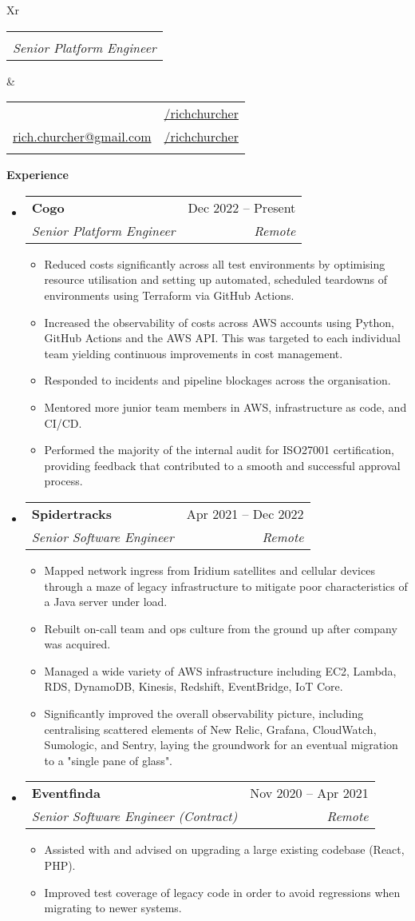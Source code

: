 \documentclass[12pt]{article}
\makeatletter
\def \fullname {Rich Churcher}
\def \subtitle {Senior Platform Engineer}
\def \linkedinicon {\faLinkedin}
\def \linkedinlink {https://linkedin.com/in/dwight-schrute/}
\def \linkedintext {/richchurcher}
\def \phoneicon {\faPhone}
\def \phonetext {+64-21-126-3919}
\def \emailicon {\faEnvelope}
\def \emaillink {mailto:rich.churcher@gmail.com}
\def \emailtext {rich.churcher@gmail.com}
\def \githubicon {\faGithub}
\def \githublink {https://github.com/richchurcher}
\def \githubtext {/richchurcher}
\def \headertype {\doublecol} %
\def \linkedin {\linkedinicon \hspace{1em}\href{\linkedinlink}{\linkedintext}}
\def \phone {\phoneicon \hspace{1em}{\phonetext}}
\def \email {\emailicon \hspace{1em}\href{\emaillink}{\emailtext}}
\def \github {\githubicon \hspace{1em}\href{\githublink}{\githubtext}}
\renewcommand{\section}[2]{\vspace{0.5ex}
  \colorbox{secondary}{\color{white}\raggedbottom\normalsize\textbf{{#1}{\hspace{0.5em}#2}}}
}
\newcommand{\resumeEntry}[1]{\begin{itemize}[leftmargin=2.5mm]#1\end{itemize}}
\newcommand{\resumeItemList}[1]{\begin{itemize}[leftmargin=4.5mm]#1\end{itemize}}
\newcommand{\resumeItem}[1]{
  \item\small{
    {#1 \vspace{-0.9ex}}
  }
}
\newcommand{\resumeEntryTSDL}[4]{
  \vspace{-0.5ex}\item[]
    \begin{tabularx}{0.97\textwidth}{X@{\hspace{5em}}r}
      \textbf{\color{primary}#1} & {\firabook\color{accent}\small#2} \\
      \textit{\color{accent}\small#3} & \textit{\color{accent}\small#4} \\
    \end{tabularx}\vspace{-0.9ex}
}
\newcommand{\doublecol}[6]{
  \begin{tabularx}{\textwidth}{Xr}
    {
      \begin{tabular}[c]{l}
        \fontsize{35}{45}\selectfont{\color{primary}{{\textbf{\fullname}}}} \\
          {\textit{\subtitle}}
      \end{tabular}\vspace{2ex}
    } & {
      \begin{tabular}[c]{l@{\hspace{1em}}l}
        {\small#4} & {\small#1} \\
        {\small#5} & {\small#2} \\
        {\small#6} & {\small#3}
      \end{tabular}
    }
  \end{tabularx}
}
\newcommand{\singlecol}[6]{
  \begin{tabularx}{\textwidth}{Xr}
    {
      \begin{tabular}[b]{l}
        \fontsize{35}{45}\selectfont{\color{primary}{{\textbf{\fullname}}}} \\
        {\textit{\subtitle}} %
      \end{tabular}
    } & {
      \begin{tabular}[c]{l}
        {\small#1} \\
        {\small#2} \\
        {\small#3} \\
        {\small#4} \\
        {\small#5} \\
        {\small#6}
      \end{tabular}
    }
  \end{tabularx}
}
\makeatother
\begin{document}
\headertype{\linkedin}{\github}{}{\phone}{\email}{}

\section{\faPieChart}{Experience}

  \resumeEntry{
    \resumeEntryTSDL
      {Cogo}{Dec 2022 -- Present}
      {Senior Platform Engineer}{Remote}
    \resumeItemList{
      \resumeItem {Reduced costs significantly across all test environments by optimising resource utilisation and setting up automated, scheduled teardowns of environments using Terraform via GitHub Actions.}
      \resumeItem {Increased the observability of costs across AWS accounts using Python, GitHub Actions and the AWS API. This was targeted to each individual team yielding continuous improvements in cost management.}
      \resumeItem {Responded to incidents and pipeline blockages across the organisation.}
      \resumeItem {Mentored more junior team members in AWS, infrastructure as code, and CI/CD.}
      \resumeItem {Performed the majority of the internal audit for ISO27001 certification, providing feedback that contributed to a smooth and successful approval process.}
    }
  }

  \resumeEntry{
    \resumeEntryTSDL
      {Spidertracks}{Apr 2021 -- Dec 2022}
      {Senior Software Engineer}{Remote}
    \resumeItemList{
      \resumeItem {Mapped network ingress from Iridium satellites and cellular devices through a maze of legacy infrastructure to mitigate poor characteristics of a Java server under load.}
      \resumeItem {Rebuilt on-call team and ops culture from the ground up after company was acquired.}
      \resumeItem {Managed a wide variety of AWS infrastructure including EC2, Lambda, RDS, DynamoDB, Kinesis, Redshift, EventBridge, IoT Core.}
      \resumeItem {Significantly improved the overall observability picture, including centralising scattered elements of New Relic, Grafana, CloudWatch, Sumologic, and Sentry, laying the groundwork for an eventual migration to a "single pane of glass".}
    }
  }

  \resumeEntry{
    \resumeEntryTSDL
      {Eventfinda}{Nov 2020 -- Apr 2021}
      {Senior Software Engineer (Contract)}{Remote}
    \resumeItemList{
        \resumeItem {Assisted with and advised on upgrading a large existing codebase (React, PHP).}
        \resumeItem {Improved test coverage of legacy code in order to avoid regressions when migrating to newer systems.}
    }
  }
\end{document}
